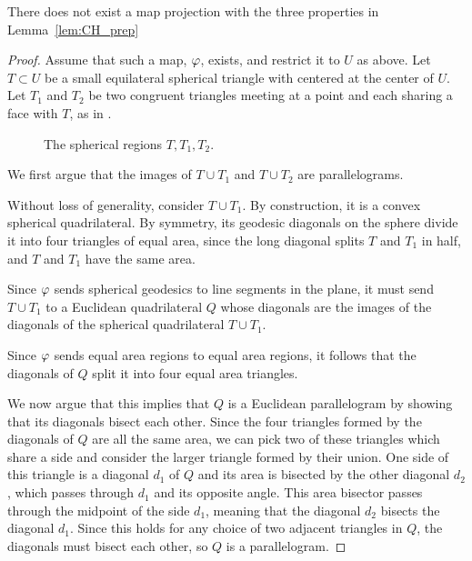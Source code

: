 \begin{theorem}
	There does not exist a map projection with the three properties in Lemma~\ref{lem:CH_prep}
\end{theorem}
\begin{proof}
	Assume that such a map, $\varphi$, exists, and restrict 
	it to $U$ as above. Let $T\subset U$ be a 
	small equilateral spherical  triangle with centered at 
	the center of $U$. Let $T_1$ and $T_2$ be two 
	congruent triangles meeting at a point and 
	each sharing a face with $T$, as in .

\begin{figure}[!htb]
	\centering
	
	\caption{The spherical regions $T,T_1,T_2$.}
	\label{fig:sphtris}
\end{figure}












We first argue that the images of $T\cup T_1$ and $T\cup T_2$ are parallelograms.

Without loss of generality, consider $T\cup T_1$.  By construction, it is a 
convex spherical quadrilateral. By symmetry, its geodesic 
diagonals on the sphere divide it into four triangles of equal area, since the long diagonal splits $T$ and $T_1$ in 
half, and $T$ and $T_1$ have the same area.


		Since $\varphi$ sends spherical geodesics to line segments in the plane, it must send 
		$T\cup T_1$ to a Euclidean quadrilateral $Q$ whose diagonals 
		are the images of the diagonals of the spherical quadrilateral $T\cup T_1$.
		
		 Since 
		$\varphi$ sends equal area regions to equal area 
		regions, it follows that the diagonals 
		of $Q$ split it into four equal area triangles.
		
		We now argue that this implies that $Q$ is a Euclidean parallelogram by showing that its diagonals bisect each other.  Since the four triangles 
		formed by the diagonals of $Q$ are all the same area, we can pick two of these triangles which share a side 
		and consider the larger triangle formed by their union.  One side of this triangle is a diagonal $d_1$ of $Q$ and its area is 
		bisected by the other diagonal $d_2$, which passes through $d_1$ and its opposite angle.  This area bisector passes through the midpoint of the side $d_1$, meaning that the diagonal $d_2$ bisects the diagonal $d_1$.  Since this holds for any choice of two adjacent triangles in $Q$, the diagonals must bisect each other, so $Q$ is a parallelogram.
		

\end{proof}
